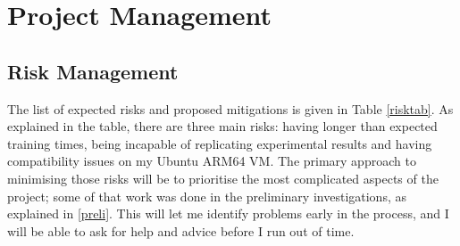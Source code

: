 
\chapter{Project Management} %

\label{Chapter5} %



\section{Risk Management}
\label{risman}

The list of expected risks and proposed mitigations is given in Table \ref{risktab}. As explained in the table, there are three main risks: having longer than expected training times, being incapable of replicating experimental results and having compatibility issues on my Ubuntu ARM64 VM. The primary approach to minimising those risks will be to prioritise the most complicated aspects of the project; some of that work was done in the preliminary investigations, as explained in \ref{preli}. This will let me identify problems early in the process, and I will be able to ask for help and advice before I run out of time.

